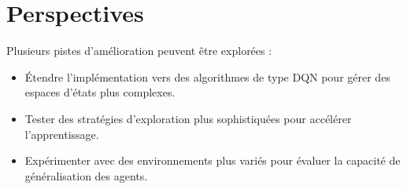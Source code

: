 \documentclass{article}
\begin{document}
\section{Perspectives}

Plusieurs pistes d'amélioration peuvent être explorées :
\begin{itemize}
    \item Étendre l'implémentation vers des algorithmes de type DQN pour gérer des espaces d'états plus complexes.
    \item Tester des stratégies d'exploration plus sophistiquées pour accélérer l'apprentissage.
    \item Expérimenter avec des environnements plus variés pour évaluer la capacité de généralisation des agents.
\end{itemize}
\end{document}
